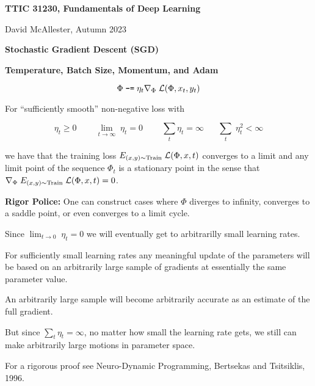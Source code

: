 


\newcommand{\solution}[1]{\bigskip {\bf Solution}: #1}



{\Huge
  \centerline{\bf TTIC 31230, Fundamentals of Deep Learning}
  \bigskip
  \centerline{David McAllester, Autumn 2023}
  \vfill
  \centerline{\bf Stochastic Gradient Descent (SGD)}
  \vfill
  \vfill
  \centerline{\bf Temperature, Batch Size, Momentum, and Adam}



$$\Phi \;\mbox{\tt -=} \; \eta_t \nabla_\Phi\;{\cal L}(\Phi,x_t,y_t)$$

\vfill
For ``sufficiently smooth'' non-negative loss with

\vfill
$$\eta_t \geq 0\;\;\;\;\;\;\;\;\lim_{t \rightarrow \infty} \;\eta_t = 0\;\;\;\;\;\;\;\;\sum_t \eta_t = \infty \;\;\;\;\;\;\sum_t \;\eta_t^2 < \infty$$

\vfill
we have that the training loss $E_{(x,y) \sim \mathrm{Train}}\; {\cal L}(\Phi,x,t)$ converges to a limit and any limit point of the sequence $\Phi_t$
is a stationary point in the sense that {\huge  $\nabla_\Phi \; E_{(x,y) \sim \mathrm{Train}} \;{\cal L}(\Phi,x,t) = 0$}.

\vfill
{\Large
\vfill
{\bf Rigor Police:} One can construct cases where $\Phi$ diverges to infinity, converges to a saddle point, or even converges to a limit cycle.

}


Since $\lim_{t \rightarrow 0} \;\eta_t = 0$ we will eventually get to arbitrarilly small learning rates.

\vfill
For sufficiently small learning rates any meaningful update of the parameters will be based on an arbitrarily large sample
of gradients at essentially the same parameter value.

\vfill
An arbitrarily large sample will become arbitrarily accurate as an estimate of the full gradient.

\vfill
But since $\sum_t \eta_t = \infty$, no matter how small the learning rate gets, we still can make arbitrarily large motions in parameter space.


\vfill
{\Large
\vfill
For a rigorous proof see Neuro-Dynamic Programming, Bertsekas and Tsitsiklis, 1996.}


}
